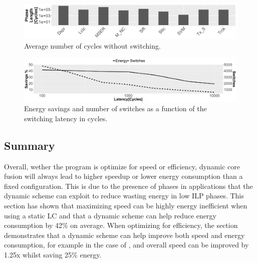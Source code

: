 \begin{figure}[t]
    \centering
	\includegraphics[width=\textwidth]{cases-paper/graphics/Exploration/phase_len.pdf}
\vspace*{-6mm}
    \caption{Average number of cycles without switching.}
    \label{fig:avlen}
\vspace{-2mm}
\end{figure}
\begin{figure}[t]
\centering
	\includegraphics[width=\textwidth]{cases-paper/graphics/Exploration/latency_en_sp_sw.pdf}
    \caption{Energy savings and number of switches as a function of the switching latency in cycles.}
    \label{fig:enlatency}
\vspace{5mm}
\end{figure}

\subsection{Summary}

Overall, wether the program is optimize for speed or efficiency, dynamic core fusion will always lead to higher speedup or lower energy consumption than a fixed configuration.
This is due to the presence of phases in applications that the dynamic scheme can exploit to reduce wasting energy in low ILP phases.
This section has shown that maximizing speed can be highly energy inefficient when using a static LC and that a dynamic scheme can help reduce energy consumption by 42\% on average.
When optimizing for efficiency, the section demonstrates that a dynamic scheme can help improve both speed and energy consumption, for example in the case of , and overall speed can be improved by 1.25x whilst saving 25\% energy.

